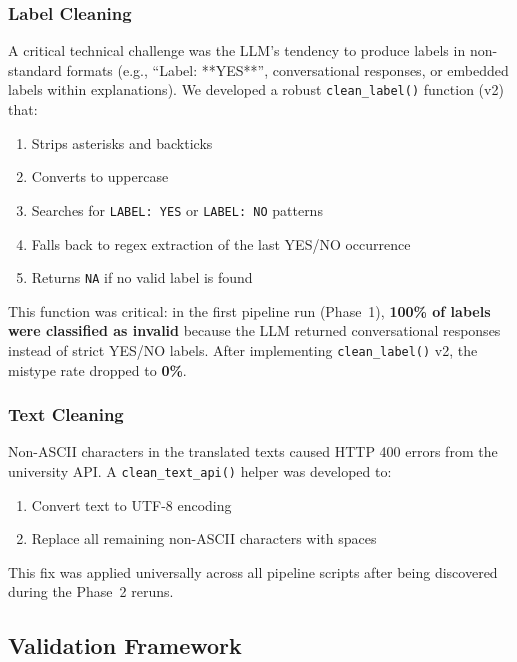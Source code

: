 \subsubsection{Label Cleaning}

A critical technical challenge was the LLM's tendency to produce labels in non-standard formats (e.g., ``Label: **YES**'', conversational responses, or embedded labels within explanations). We developed a robust \texttt{clean\_label()} function (v2) that:

\begin{enumerate}
    \item Strips asterisks and backticks
    \item Converts to uppercase
    \item Searches for \texttt{LABEL: YES} or \texttt{LABEL: NO} patterns
    \item Falls back to regex extraction of the last YES/NO occurrence
    \item Returns \texttt{NA} if no valid label is found
\end{enumerate}

This function was critical: in the first pipeline run (Phase~1), \textbf{100\% of labels were classified as invalid} because the LLM returned conversational responses instead of strict YES/NO labels. After implementing \texttt{clean\_label()} v2, the mistype rate dropped to \textbf{0\%}.

\subsubsection{Text Cleaning}

Non-ASCII characters in the translated texts caused HTTP 400 errors from the university API. A \texttt{clean\_text\_api()} helper was developed to:

\begin{enumerate}
    \item Convert text to UTF-8 encoding
    \item Replace all remaining non-ASCII characters with spaces
\end{enumerate}

This fix was applied universally across all pipeline scripts after being discovered during the Phase~2 reruns.

\subsection{Validation Framework}

